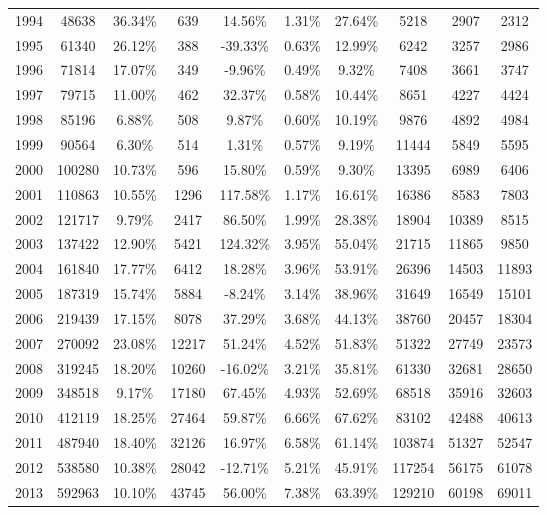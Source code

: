 \begin{table}[h]
{\begin{tabular}{@{}cccccccccc@{}}
1994 & 48638   & 36.34\% & 639   & 14.56\%   & 1.31\% & 27.64\% & 5218   & 2907  & 2312   \\
1995 & 61340   & 26.12\% & 388   & -39.33\%  & 0.63\% & 12.99\% & 6242   & 3257  & 2986   \\
1996 & 71814   & 17.07\% & 349   & -9.96\%   & 0.49\% & 9.32\%  & 7408   & 3661  & 3747   \\
1997 & 79715   & 11.00\% & 462   & 32.37\%   & 0.58\% & 10.44\% & 8651   & 4227  & 4424   \\
1998 & 85196   & 6.88\%  & 508   & 9.87\%    & 0.60\% & 10.19\% & 9876   & 4892  & 4984   \\
1999 & 90564   & 6.30\%  & 514   & 1.31\%    & 0.57\% & 9.19\%  & 11444  & 5849  & 5595   \\
2000 & 100280  & 10.73\% & 596   & 15.80\%   & 0.59\% & 9.30\%  & 13395  & 6989  & 6406   \\
2001 & 110863  & 10.55\% & 1296  & 117.58\%  & 1.17\% & 16.61\% & 16386  & 8583  & 7803   \\
2002 & 121717  & 9.79\%  & 2417  & 86.50\%   & 1.99\% & 28.38\% & 18904  & 10389 & 8515   \\
2003 & 137422  & 12.90\% & 5421  & 124.32\%  & 3.95\% & 55.04\% & 21715  & 11865 & 9850   \\
2004 & 161840  & 17.77\% & 6412  & 18.28\%   & 3.96\% & 53.91\% & 26396  & 14503 & 11893  \\
2005 & 187319  & 15.74\% & 5884  & -8.24\%   & 3.14\% & 38.96\% & 31649  & 16549 & 15101  \\
2006 & 219439  & 17.15\% & 8078  & 37.29\%   & 3.68\% & 44.13\% & 38760  & 20457 & 18304  \\
2007 & 270092  & 23.08\% & 12217 & 51.24\%   & 4.52\% & 51.83\% & 51322  & 27749 & 23573  \\
2008 & 319245  & 18.20\% & 10260 & -16.02\%  & 3.21\% & 35.81\% & 61330  & 32681 & 28650  \\
2009 & 348518  & 9.17\%  & 17180 & 67.45\%   & 4.93\% & 52.69\% & 68518  & 35916 & 32603  \\
2010 & 412119  & 18.25\% & 27464 & 59.87\%   & 6.66\% & 67.62\% & 83102  & 42488 & 40613  \\
2011 & 487940  & 18.40\% & 32126 & 16.97\%   & 6.58\% & 61.14\% & 103874 & 51327 & 52547  \\
2012 & 538580  & 10.38\% & 28042 & -12.71\%  & 5.21\% & 45.91\% & 117254 & 56175 & 61078  \\
2013 & 592963  & 10.10\% & 43745 & 56.00\%   & 7.38\% & 63.39\% & 129210 & 60198 & 69011  \\

\end{tabular}}
\end{table}
